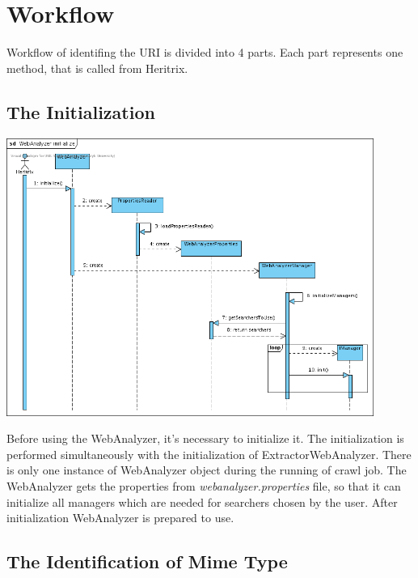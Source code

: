 \documentclass[11pt,a4paper]{article}
\begin{document}

\newpage
\section{Workflow}

Workflow of identifing the URI is divided into 4 parts. Each part represents one method, that is called from Heritrix.

\subsection{The Initialization}

\begin{center}
\includegraphics[width=120mm]{SD1.png}
\end{center}

Before using the WebAnalyzer, it's necessary to initialize it. The i\-ni\-tia\-li\-za\-tion is performed simultaneously with the initialization of Extractor\-Web\-Analyzer. There is only one instance of WebAnalyzer object during the running of crawl job. The WebAnalyzer gets the properties from \emph{webanalyzer.properties} file, so that it can initialize all managers which are needed for searchers chosen by the user. After initialization WebAnalyzer is prepared to use.

\subsection{The Identification of Mime Type}
\end{document}
